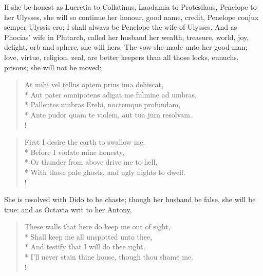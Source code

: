 If she be honest as Lucretia to Collatinus, Laodamia to Protesilaus,
Penelope to her Ulysses, she will so continue her honour, good name,
credit, Penelope conjux semper Ulyssis ero; I shall always be Penelope
the wife of Ulysses. And as Phocias' wife in Plutarch, called her
husband her wealth, treasure, world, joy, delight, orb and sphere, she
will hers. The vow she made unto her good man; love, virtue, religion,
zeal, are better keepers than all those locks, eunuchs, prisons; she
will not be moved:
%
\begin{latin}
\begin{verse}%
At mihi vel tellus optem prius ima dehiscat,\\*
Aut pater omnipotens adigat me fulmine ad umbras,\\*
Pallentes umbras Erebi, noctemque profundam,\\*
Ante pudor quam te violem, aut tua jura resolvam.\\!
\end{verse}%
\end{latin}
\translationrule%
\begin{verse}%
First I desire the earth to swallow me.\\*
Before I violate mine honesty,\\*
Or thunder from above drive me to hell,\\*
With those pale ghosts, and ugly nights to dwell.\\!
\end{verse}%
%

She is resolved with Dido to be chaste; though her husband be false,
she will be true: and as Octavia writ to her Antony,
%
\begin{verse}%
These walls that here do keep me out of sight,\\*
Shall keep me all unspotted unto thee,\\*
And testify that I will do thee right,\\*
I'll never stain thine house, though thou shame me.\\!
\end{verse}%

